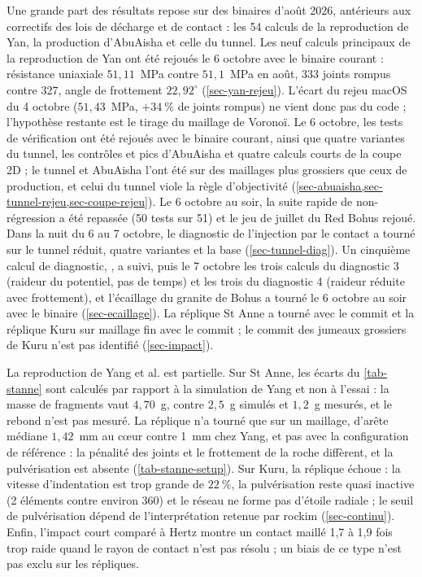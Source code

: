 Une grande part des résultats repose sur des binaires d'août 2026, antérieurs aux correctifs des lois de décharge et de contact : les 54 calculs de la reproduction de Yan, la production d'AbuAisha et celle du tunnel. Les neuf calculs principaux de la reproduction de Yan ont été rejoués le 6 octobre avec le binaire courant : résistance uniaxiale $51{,}11$~MPa contre $51{,}1$~MPa en août, 333 joints rompus contre 327, angle de frottement $22{,}92^\circ$ (\cref{sec-yan-rejeu}). L'écart du rejeu macOS du 4 octobre ($51{,}43$~MPa, $+34~\%$ de joints rompus) ne vient donc pas du code ; l'hypothèse restante est le tirage du maillage de Voronoï. Le 6 octobre, les tests de vérification ont été rejoués avec le binaire courant, ainsi que quatre variantes du tunnel, les contrôles et pics d'AbuAisha et quatre calculs courts de la coupe 2D ; le tunnel et AbuAisha l'ont été sur des maillages plus grossiers que ceux de production, et celui du tunnel viole la règle d'objectivité (\cref{sec-abuaisha,sec-tunnel-rejeu,sec-coupe-rejeu}). Le 6 octobre au soir, la suite rapide de non-régression a été repassée (50 tests sur 51) et le jeu de juillet du Red Bohus rejoué. Dans la nuit du 6 au 7 octobre, le diagnostic de l'injection par le contact a tourné sur le tunnel réduit, quatre variantes et la base (\cref{sec-tunnel-diag}). Un cinquième calcul de diagnostic, , a suivi, puis le 7 octobre les trois calculs du diagnostic 3 (raideur du potentiel, pas de temps) et les trois du diagnostic 4 (raideur réduite avec frottement), et l'écaillage du granite de Bohus a tourné le 6 octobre au soir avec le binaire  (\cref{sec-ecaillage}). La réplique St Anne a tourné avec le commit  et la réplique Kuru sur maillage fin avec le commit  ; le commit des jumeaux grossiers de Kuru n'est pas identifié (\cref{sec-impact}).

La reproduction de Yang et al. est partielle. Sur St Anne, les écarts du \cref{tab-stanne} sont calculés par rapport à la simulation de Yang et non à l'essai : la masse de fragments vaut $4{,}70$~g, contre $2{,}5$~g simulés et $1{,}2$~g mesurés, et le rebond n'est pas mesuré. La réplique n'a tourné que sur un maillage, d'arête médiane $1{,}42$~mm au cœur contre 1~mm chez Yang, et pas avec la configuration de référence : la pénalité des joints et le frottement de la roche diffèrent, et la pulvérisation est absente (\cref{tab-stanne-setup}). Sur Kuru, la réplique échoue : la vitesse d'indentation est trop grande de $22~\%$, la pulvérisation reste quasi inactive (2 éléments contre environ 360) et le réseau ne forme pas d'étoile radiale ; le seuil de pulvérisation dépend de l'interprétation retenue par rockim (\cref{sec-continu}). Enfin, l'impact court comparé à Hertz montre un contact maillé 1,7 à 1,9 fois trop raide quand le rayon de contact n'est pas résolu ; un biais de ce type n'est pas exclu sur les répliques.

